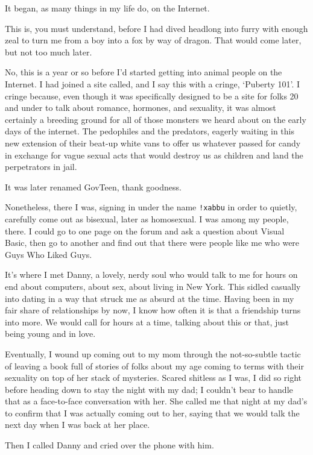 It began, as many things in my life do, on the Internet.

This is, you must understand, before I had dived headlong into furry with enough zeal to turn me from a boy into a fox by way of dragon.  That would come later, but not too much later.

No, this is a year or so before I'd started getting into animal people on the Internet.  I had joined a site called, and I say this with a cringe, `Puberty 101'.  I cringe because, even though it was specifically designed to be a site for folks 20 and under to talk about romance, hormones, and sexuality, it was almost certainly a breeding ground for all of those monsters we heard about on the early days of the internet.  The pedophiles and the predators, eagerly waiting in this new extension of their beat-up white vans to offer us whatever passed for candy in exchange for vague sexual acts that would destroy us as children and land the perpetrators in jail.

It was later renamed GovTeen, thank goodness.

Nonetheless, there I was, signing in under the name \texttt{!xabbu} in order to quietly, carefully come out as bisexual, later as homosexual.  I was among my people, there.  I could go to one page on the forum and ask a question about Visual Basic, then go to another and find out that there were people like me who were Guys Who Liked Guys.

It's where I met Danny, a lovely, nerdy soul who would talk to me for hours on end about computers, about sex, about living in New York.  This sidled casually into dating in a way that struck me as absurd at the time.  Having been in my fair share of relationships by now, I know how often it is that a friendship turns into more.  We would call for hours at a time, talking about this or that, just being young and in love.

Eventually, I wound up coming out to my mom through the not-so-subtle tactic of leaving a book full of stories of folks about my age coming to terms with their sexuality on top of her stack of mysteries.  Scared shitless as I was, I did so right before heading down to stay the night with my dad; I couldn't bear to handle that as a face-to-face conversation with her.  She called me that night at my dad's to confirm that I was actually coming out to her, saying that we would talk the next day when I was back at her place.

Then I called Danny and cried over the phone with him.

